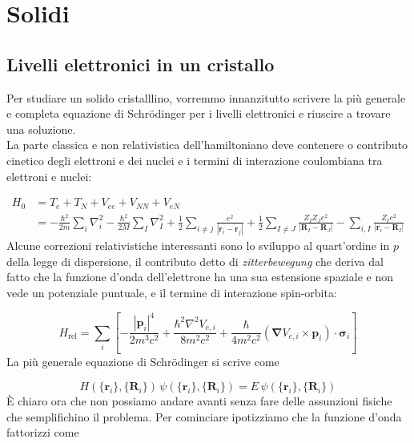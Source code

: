 \documentclass[a4paper]{report}
\begin{document}
\chapter{Solidi}

\section{Livelli elettronici in un cristallo}

Per studiare un solido cristalllino, vorremmo innanzitutto scrivere la più generale e completa equazione di Schr\"odinger per i livelli elettronici e riuscire a trovare una soluzione. \\
La parte classica e non relativistica dell'hamiltoniano deve contenere o contributo cinetico degli elettroni e dei nuclei e i termini di interazione coulombiana tra elettroni e nuclei:

\begin{equation}
    \begin{split}
        H_0 & = T_e + T_N + V_{ee} + V_{NN} + V_{eN} \\
        & = - \frac{\hbar^2}{2m} \sum_i \nabla^2_i - \frac{\hbar^2}{2M} \sum_I \nabla^2_I + \frac{1}{2}\sum_{i\neq j} \frac{e^2}{|\mathbf{r}_i-\mathbf{r}_j|} + \frac{1}{2}\sum_{I\neq J} \frac{Z_I Z_J e^2}{|\mathbf{R}_I-\mathbf{R}_J|} - \sum_{i, I} \frac{Z_I e^2}{|\mathbf{r}_i-\mathbf{R}_I|}
    \end{split}
\end{equation}
Alcune correzioni relativistiche interessanti sono lo sviluppo al quart'ordine in $p$ della legge di dispersione, il contributo detto di \textit{zitterbewegung} che deriva dal fatto che la funzione d'onda dell'elettrone ha una sua estensione spaziale e non vede un potenziale puntuale, e il termine di interazione spin-orbita:

\begin{equation}
    H_{\text{rel}} = \sum_i \left[-\frac{|\mathbf{p}_i|^4}{2 m^3 c^2} + \frac{\hbar^2\nabla^2 V_{e,i}}{8 m^2 c^2}+\frac{\hbar}{4m^2 c^2} (\boldsymbol{\nabla} V_{e,i} \times \mathbf{p}_i)\cdot \boldsymbol{\sigma}_i\right]
\end{equation}
La più generale equazione di Schr\"odinger si scrive come

\begin{equation}
    H(\{\mathbf{r}_i\},\{\mathbf{R}_i\})\,\psi(\{\mathbf{r}_i\},\{\mathbf{R}_i\}) = E \,\psi(\{\mathbf{r}_i\},\{\mathbf{R}_i\}) 
\end{equation}
È chiaro ora che non possiamo andare avanti senza fare delle assunzioni fisiche che semplifichino il problema. Per cominciare ipotizziamo che la funzione d'onda fattorizzi come
\end{document}
